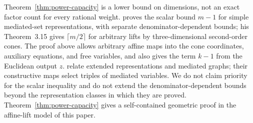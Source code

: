 Theorem~\ref{thm:power-capacity} is a lower bound on dimensions, not an
exact factor count for every rational weight.
\citet[Theorem~3.6]{Wang2024} proves the scalar bound $m-1$ for simple
mediated-set representations, with separate denominator-dependent
bounds; his Theorem~3.15 gives $\lceil m/2\rceil$ for arbitrary lifts
by three-dimensional second-order cones. The proof above allows
arbitrary affine maps into the cone coordinates, auxiliary equations,
and free variables, and also gives the term $k-1$ from the Euclidean
output $z$.
\citet[Definition~1 and Theorem~14]{BlancoMartinezAnton2024} relate
extended representations and mediated graphs; their constructive maps
select triples of mediated variables. We do not claim priority for
the scalar inequality and do not extend the denominator-dependent bounds
beyond the representation classes in which they are proved.
Theorem~\ref{thm:power-capacity} gives a self-contained geometric proof
in the affine-lift model of this paper.
